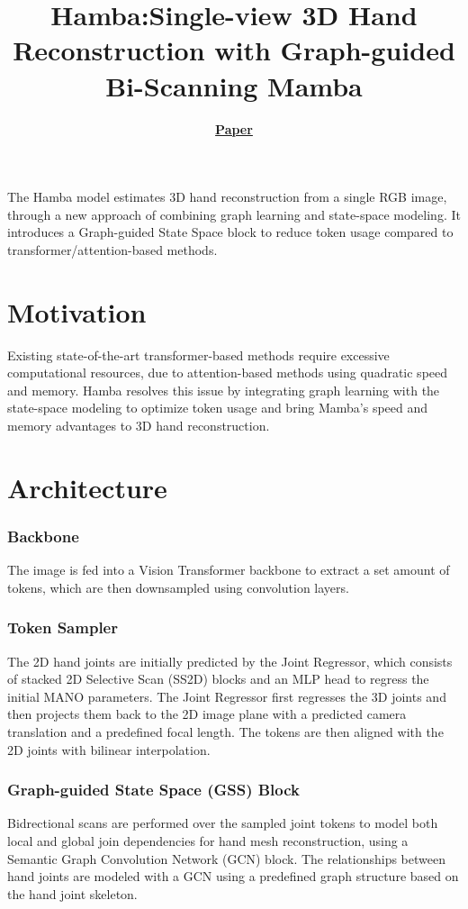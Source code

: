 \documentclass{article}
\title{Hamba:\@ Single-view 3D Hand Reconstruction with Graph-guided Bi-Scanning Mamba}
\author{\textbf{\href{https://arxiv.org/pdf/2407.09646}{Paper}}}
\date{}
\begin{document}
\maketitle

The Hamba model estimates 3D hand reconstruction from a single RGB image, through a new approach of combining graph learning and state-space modeling. It introduces a Graph-guided State Space block to reduce token usage compared to transformer/attention-based methods.

\section*{Motivation}

Existing state-of-the-art transformer-based methods require excessive computational resources, due to attention-based methods using quadratic speed and memory. Hamba resolves this issue by integrating graph learning with the state-space modeling to optimize token usage and bring Mamba's speed and memory advantages to 3D hand reconstruction.

\section*{Architecture}

\subsubsection*{Backbone}

The image is fed into a Vision Transformer backbone to extract a set amount of tokens, which are then downsampled using convolution layers.

\subsubsection*{Token Sampler}

The 2D hand joints are initially predicted by the Joint Regressor, which consists of stacked 2D Selective Scan (SS2D) blocks and an MLP head to regress the initial MANO parameters. The Joint Regressor first regresses the 3D joints and then projects them back to the 2D image plane with a predicted camera translation and a predefined focal length. The tokens are then aligned with the 2D joints with bilinear interpolation.

\subsubsection*{Graph-guided State Space (GSS) Block}
Bidrectional scans are performed over the sampled joint tokens to model both local and global join dependencies for hand mesh reconstruction, using a Semantic Graph Convolution Network (GCN) block. The relationships between hand joints are modeled with a GCN using a predefined graph structure based on the hand joint skeleton.
\end{document}
